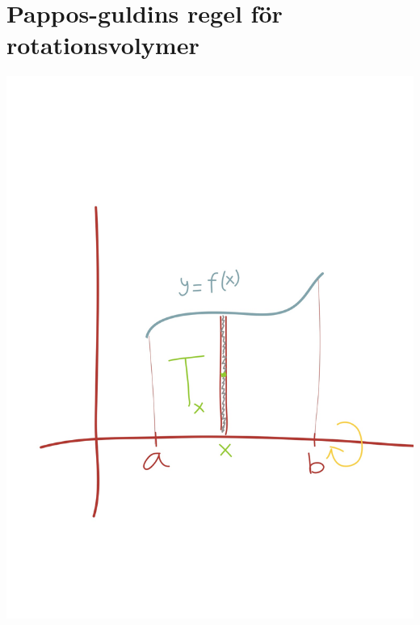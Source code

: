 \documentclass{article}
\begin{document}
\section{Pappos-guldins regel för rotationsvolymer}
\includegraphics[scale=0.10]{img/img1.jpg}
\end{document}
